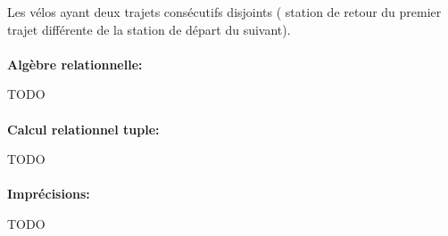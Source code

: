 \documentclass[a4paper, 12pt]{report}
\begin{document}
Les vélos ayant deux trajets consécutifs disjoints ( station de retour du premier trajet différente de la station de départ du suivant).
\paragraph{}
\textbf{Algèbre relationnelle:}

TODO %

\paragraph{}
\textbf{Calcul relationnel tuple:}

TODO %

\paragraph{}
\textbf{Imprécisions:}

TODO%
\end{document}
